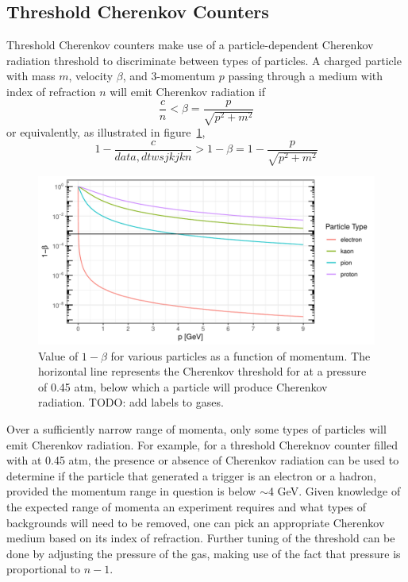 \subsection{Threshold Cherenkov Counters}
Threshold Cherenkov counters make use of a particle-dependent Cherenkov
radiation threshold to discriminate between types of particles.
A charged particle with mass $m$, velocity $\beta$, and 3-momentum $p$ passing
through a medium with index of refraction $n$ will emit Cherenkov radiation if
\begin{equation}
    \frac{c}{n} < \beta = \frac{p}{\sqrt{p^2+m^2}}
\end{equation}
or equivalently, as illustrated in figure~\ref{fig:hms_cer_threshold},
\begin{equation}
    1-\frac{c}{data,dtwsjkjkn} > 1-\beta = 1-\frac{p}{\sqrt{p^2+m^2}}
\end{equation}

\begin{figure}[!h]
    \centering
    \includegraphics[width=1.0\textwidth]{chap3/hms_cer_threshold.pdf}
    \caption{Value of $1-\beta$ for various particles as a function of
            momentum. The horizontal line represents the Cherenkov threshold
            for  at a pressure of 0.45 atm, below which a particle
            will produce Cherenkov radiation. TODO: add labels to gases.
            }
    \label{fig:hms_cer_threshold}
\end{figure}

Over a sufficiently narrow range of momenta, only some types of particles will
emit Cherenkov radiation.
For example, for a threshold Chereknov counter filled with  at
0.45 atm, the presence or absence of Cherenkov radiation can be used to
determine if the particle that generated a trigger is an electron or a hadron,
provided the momentum range in question is below $\sim$4 \si{\giga\eV}.
Given knowledge of the expected range of momenta an experiment requires and
what types of backgrounds will need to be removed, one can pick an appropriate
Cherenkov medium based on its index of refraction. Further tuning of the
threshold can be done by adjusting the pressure of the gas, making use of
the fact that pressure is proportional to $n-1$.

